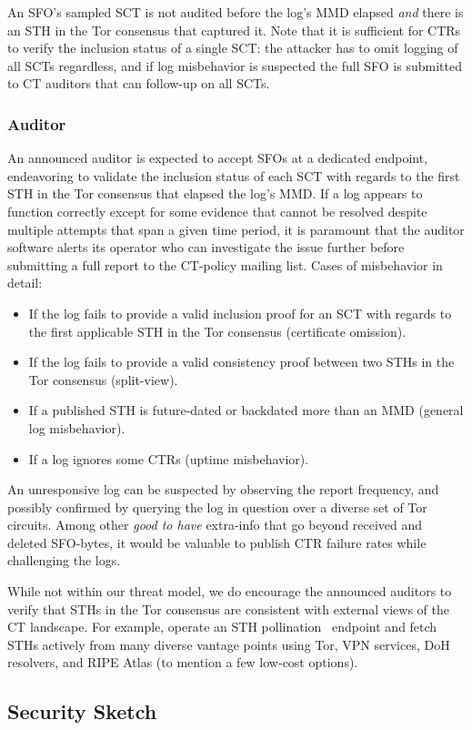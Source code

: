 An SFO's sampled SCT is not audited before the log's MMD elapsed \emph{and}
there is an STH in the Tor consensus that captured it.  Note that it is
sufficient for CTRs to verify the inclusion status of a single SCT:
	the attacker has to omit logging of all SCTs regardless, and
	if log misbehavior is suspected the full SFO is submitted to CT auditors
		that can follow-up on all SCTs.

\subsubsection{Auditor} \label{sec:ext-auditor:auditor}
An announced auditor is expected to accept SFOs at a dedicated endpoint,
endeavoring to validate the inclusion status of each SCT with regards to the
first STH in the Tor consensus that elapsed the log's MMD.  If a log appears to
function correctly except for some evidence that cannot be
resolved despite multiple attempts that span a given time period, it is
paramount that the auditor software alerts its operator who can investigate
the issue further before submitting a full report to the CT-policy mailing list.
Cases of misbehavior in detail:
\begin{itemize}
	\item If the log fails to provide a valid inclusion proof for an SCT with
		regards to the first applicable STH in the Tor consensus
		(certificate omission).
	\item If the log fails to provide a valid consistency proof between two
		STHs in the Tor consensus
		(split-view).
	\item If a published STH is future-dated or backdated more than an MMD
		(general log misbehavior).
	\item If a log ignores some CTRs (uptime misbehavior).
\end{itemize}

An unresponsive log can be suspected by observing the report frequency, and
possibly confirmed by querying the log in question over a diverse set of Tor
circuits.  Among other \emph{good to have} extra-info that go beyond received
and deleted SFO-bytes, it would be valuable to publish CTR failure rates while
challenging the logs.

While not within our threat model, we do encourage the announced auditors to
verify that STHs in the Tor consensus are consistent with external views of the
CT landscape.  For example, operate an STH pollination~\cite{nordberg} endpoint
and fetch STHs actively from many diverse vantage points using Tor, VPN
services, DoH resolvers, and RIPE Atlas (to mention a few low-cost options).

\subsection{Security Sketch} \label{sec:ext-auditor:analysis}
